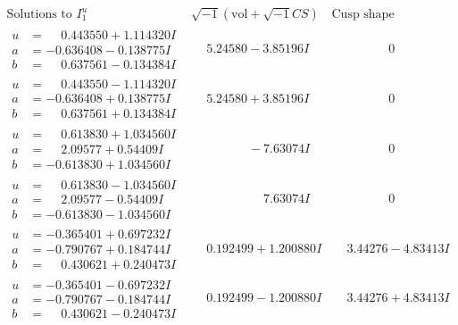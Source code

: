 \documentclass[1p]{elsarticle_modified}
\theoremstyle{definition}
\newcommand{\I}{\sqrt{-1}}
\begin{document}
$$\begin{array}{c|c|c}
\text{Solutions to }I^u_{1}& \I (\text{vol} + \sqrt{-1}CS) & \text{Cusp shape}\\
 \hline 
\begin{aligned}
u &= \phantom{-}0.443550 + 1.114320 I \\
a &= -0.636408 - 0.138775 I \\
b &= \phantom{-}0.637561 - 0.134384 I\end{aligned}
 & \phantom{-}5.24580 - 3.85196 I & \phantom{-0.000000 } 0 \\ \hline\begin{aligned}
u &= \phantom{-}0.443550 - 1.114320 I \\
a &= -0.636408 + 0.138775 I \\
b &= \phantom{-}0.637561 + 0.134384 I\end{aligned}
 & \phantom{-}5.24580 + 3.85196 I & \phantom{-0.000000 } 0 \\ \hline\begin{aligned}
u &= \phantom{-}0.613830 + 1.034560 I \\
a &= \phantom{-}2.09577 + 0.54409 I \\
b &= -0.613830 + 1.034560 I\end{aligned}
 & \phantom{-0.000000 } -7.63074 I & \phantom{-0.000000 } 0 \\ \hline\begin{aligned}
u &= \phantom{-}0.613830 - 1.034560 I \\
a &= \phantom{-}2.09577 - 0.54409 I \\
b &= -0.613830 - 1.034560 I\end{aligned}
 & \phantom{-0.000000 -}7.63074 I & \phantom{-0.000000 } 0 \\ \hline\begin{aligned}
u &= -0.365401 + 0.697232 I \\
a &= -0.790767 + 0.184744 I \\
b &= \phantom{-}0.430621 + 0.240473 I\end{aligned}
 & \phantom{-}0.192499 + 1.200880 I & \phantom{-}3.44276 - 4.83413 I \\ \hline\begin{aligned}
u &= -0.365401 - 0.697232 I \\
a &= -0.790767 - 0.184744 I \\
b &= \phantom{-}0.430621 - 0.240473 I\end{aligned}
 & \phantom{-}0.192499 - 1.200880 I & \phantom{-}3.44276 + 4.83413 I \\ \hline\begin{aligned}

\end{aligned}
\end{array}$$
\end{document}
